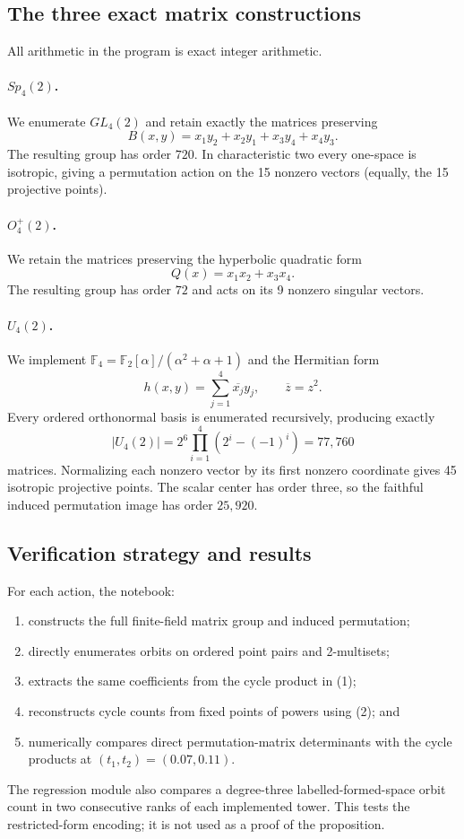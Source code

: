 \documentclass[10pt]{article}
\newcommand{\F}{\mathbb F}
\begin{document}
\subsection{The three exact matrix constructions}
All arithmetic in the program is exact integer arithmetic.

\paragraph{$Sp_4(2)$.}
We enumerate $GL_4(2)$ and retain exactly the matrices preserving
\[
 B(x,y)=x_1y_2+x_2y_1+x_3y_4+x_4y_3.
\]
The resulting group has order $720$.  In characteristic two every one-space
is isotropic, giving a permutation action on the 15 nonzero vectors (equally,
the 15 projective points).

\paragraph{$O_4^+(2)$.}
We retain the matrices preserving the hyperbolic quadratic form
\[
 Q(x)=x_1x_2+x_3x_4.
\]
The resulting group has order $72$ and acts on its 9 nonzero singular vectors.

\paragraph{$U_4(2)$.}
We implement $\F_4=\F_2[\alpha]/(\alpha^2+\alpha+1)$ and the Hermitian form
\[
 h(x,y)=\sum_{j=1}^4\overline{x_j}y_j,\qquad \overline z=z^2.
\]
Every ordered orthonormal basis is enumerated recursively, producing exactly
\[
 |U_4(2)|=2^6\prod_{i=1}^4(2^i-(-1)^i)=77{,}760
\]
matrices.  Normalizing each nonzero vector by its first nonzero coordinate
gives 45 isotropic projective points.  The scalar center has order three, so
the faithful induced permutation image has order $25{,}920$.

\subsection{Verification strategy and results}
For each action, the notebook:
\begin{enumerate}
 \item constructs the full finite-field matrix group and induced permutation;
 \item directly enumerates orbits on ordered point pairs and 2-multisets;
 \item extracts the same coefficients from the cycle product in (1);
 \item reconstructs cycle counts from fixed points of powers using (2); and
 \item numerically compares direct permutation-matrix determinants with the
 cycle products at $(t_1,t_2)=(0.07,0.11)$.
\end{enumerate}
The regression module also compares a degree-three labelled-formed-space
orbit count in two consecutive ranks of each implemented tower.  This tests
the restricted-form encoding; it is not used as a proof of the proposition.
\end{document}
